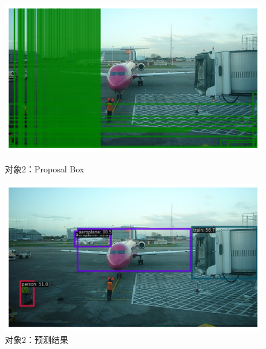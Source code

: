 \documentclass[notitlepage,cs4size,punct,oneside]{ctexrep}
\numberwithin{equation}{chapter}
\theoremstyle{mystyle}
\begin{document}
\begin{figure}[!htpb]
    \centering
    \begin{minipage}[t]{0.49\textwidth}
    \includegraphics[width=\linewidth]{2ppbox.png}
    \caption{对象2：Proposal Box}
    \label{mAPfrcnn}
    \end{minipage}
    \begin{minipage}[t]{0.49\textwidth}
    \includegraphics[width=\linewidth]{2result.png}
    \caption{对象2：预测结果}
    \label{frcnn_loss}
    \end{minipage}
\end{figure}
\end{document}
